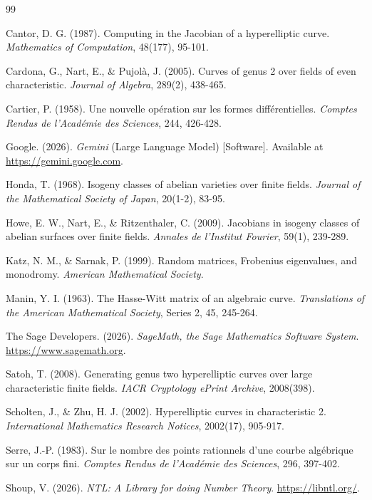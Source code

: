 \documentclass[11pt,letterpaper]{article}
\begin{document}
\begin{thebibliography}{99}

Cantor, D. G. (1987). Computing in the Jacobian of a hyperelliptic curve. \textit{Mathematics of Computation}, 48(177), 95-101.

Cardona, G., Nart, E., \& Pujolà, J. (2005). Curves of genus 2 over fields of even characteristic. \textit{Journal of Algebra}, 289(2), 438-465.

Cartier, P. (1958). Une nouvelle op\'{e}ration sur les formes diff\'{e}rentielles. \textit{Comptes Rendus de l'Acad\'{e}mie des Sciences}, 244, 426-428.

Google. (2026). \textit{Gemini} (Large Language Model) [Software]. Available at \url{https://gemini.google.com}.

Honda, T. (1968). Isogeny classes of abelian varieties over finite fields. \textit{Journal of the Mathematical Society of Japan}, 20(1-2), 83-95.

Howe, E. W., Nart, E., \& Ritzenthaler, C. (2009). Jacobians in isogeny classes of abelian surfaces over finite fields. \textit{Annales de l'Institut Fourier}, 59(1), 239-289.

Katz, N. M., \& Sarnak, P. (1999). Random matrices, Frobenius eigenvalues, and monodromy. \textit{American Mathematical Society}.

Manin, Y. I. (1963). The Hasse-Witt matrix of an algebraic curve. \textit{Translations of the American Mathematical Society}, Series 2, 45, 245-264.

The Sage Developers. (2026). \textit{SageMath, the Sage Mathematics Software System}. \url{https://www.sagemath.org}.

Satoh, T. (2008). Generating genus two hyperelliptic curves over large characteristic finite fields. \textit{IACR Cryptology ePrint Archive}, 2008(398).

Scholten, J., \& Zhu, H. J. (2002). Hyperelliptic curves in characteristic 2. \textit{International Mathematics Research Notices}, 2002(17), 905-917.

Serre, J.-P. (1983). Sur le nombre des points rationnels d'une courbe algébrique sur un corps fini. \textit{Comptes Rendus de l'Académie des Sciences}, 296, 397-402.

Shoup, V. (2026). \textit{NTL: A Library for doing Number Theory}. \url{https://libntl.org/}.


\end{thebibliography}
\end{document}
